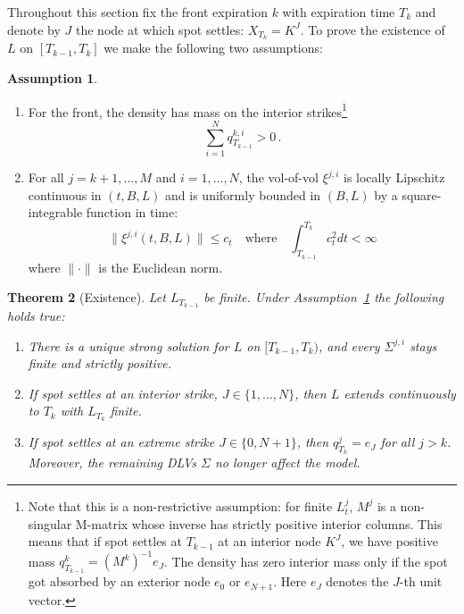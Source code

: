 \documentclass[11pt]{article}
\theoremstyle{plain}
\newtheorem{theorem}{Theorem}[section]
\theoremstyle{definition}
\newtheorem{assumption}[theorem]{Assumption}
\theoremstyle{remark}
\begin{document}
Throughout this section fix the front expiration $k$ with expiration time $T_k$ and denote by $J$ the node at which spot settles: $X_{T_k} = K^J$. To prove the existence of $L$ on $[T_{k-1}, T_k]$ we make the following two assumptions: 
\begin{assumption}
\label{assumption:existence_mw}
\begin{enumerate}[label=(\roman*)]
  \item For the front, the density has mass on the interior strikes\footnote{Note that this is a non-restrictive assumption: for finite $L_t^{j}$, $M^j$ is a non-singular M-matrix whose inverse has strictly positive interior columns. This means that if spot settles at $T_{k-1}$ at an interior node $K^J$, we have positive mass $q^k_{T_{k-1}}=(M^k)^{-1}e_J$. The density has zero interior mass only if the spot got absorbed by an exterior node $e_0$ or $e_{N+1}$. Here $e_J$ denotes the $J$-th unit vector.}
  $$\sum_{i=1}^N q_{T_{k-1}}^{k, i} > 0 \, .$$
  \item For all $j=k+1, \dots, M$ and $i=1, \dots, N$, the vol-of-vol $\xi^{j, i}$ is locally Lipschitz continuous in $(t, B, L)$ and is uniformly bounded in $(B, L)$ by a square-integrable function in time: 
  \begin{equation*}
    \|\xi^{j, i}(t, B, L)\| \leq c_t \quad \textrm{where} \quad \int_{T_{k-1}}^{T_k}c_t^2dt<\infty
  \end{equation*}
  where $\|\cdot\|$ is the Euclidean norm.
\end{enumerate}
\end{assumption}

\begin{theorem}[Existence]
\label{thm:existence_bh}
Let $L_{T_{k-1}} $ be finite. Under Assumption~\ref{assumption:existence_mw} the following holds true: 
\begin{enumerate}[label=(\roman*)]
  \item There is a unique strong solution for $L$ on $[T_{k-1},T_k)$, and every $\Sigma^{j,i}$ stays
    finite and strictly positive.
  \item If spot settles at an interior strike, $ J \in \lbrace 1, \dots, N \rbrace $, then $L$ extends continuously to $T_k$
    with $L_{T_k}$ finite.
  \item If spot settles at an extreme strike $ J \in \lbrace 0, N +1 \rbrace$, then $q^j_{T_k} = e_J$ for all $j > k$. Moreover, the remaining DLVs $\Sigma$ no longer affect the model. 
\end{enumerate}
\end{theorem}
\end{document}
